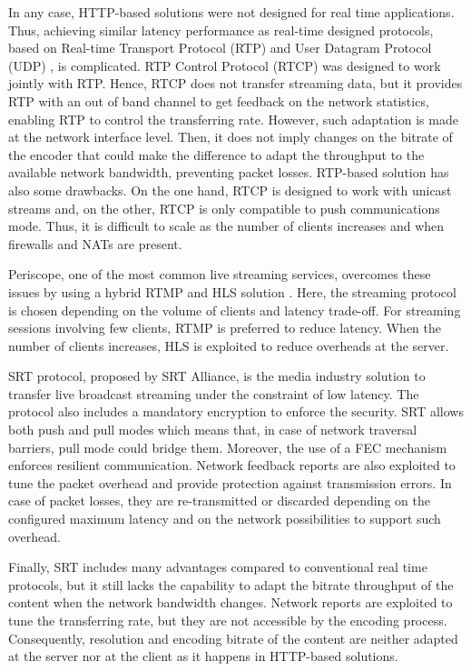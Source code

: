 In any case, HTTP-based solutions were not designed for real time applications. Thus, achieving similar latency performance as real-time designed protocols, based on Real-time Transport Protocol (RTP) and User Datagram Protocol (UDP) \cite{schulzrinne1996rtp}, is complicated.
RTP Control Protocol (RTCP) \cite{ott2010} was designed to work jointly with RTP. Hence, RTCP does not transfer streaming data, but it provides RTP with an out of band channel to get feedback on the network statistics, enabling RTP to control the transferring rate. However, such adaptation is made at the network interface level. Then, it does not imply changes on the bitrate of the encoder that could make the difference to adapt the throughput to the available network bandwidth, preventing packet losses. RTP-based solution has also some drawbacks. On the one hand, RTCP is designed to work with unicast streams and, on the other, RTCP is only compatible to push communications mode. Thus, it is difficult to scale as the number of clients increases and when firewalls and NATs are present.

Periscope, one of the most common live streaming services, overcomes these issues by using a hybrid RTMP and HLS solution \cite{wang2016anatomy}. Here, the streaming protocol is chosen depending on the volume of clients and latency trade-off. For streaming sessions involving few clients, RTMP is preferred to reduce latency. When the number of clients increases, HLS is exploited to reduce overheads at the server.

SRT \cite{srt2018} protocol, proposed by SRT Alliance, is the media industry solution to transfer live broadcast streaming under the constraint of low latency. The protocol also includes a mandatory encryption to enforce the security. SRT allows both push and pull modes which means that, in case of network traversal barriers, pull mode could bridge them. Moreover, the use of a FEC mechanism \cite{luby2002} enforces resilient communication. Network feedback reports are also exploited to tune the packet overhead and provide protection against transmission errors. In case of packet losses, they are re-transmitted or discarded depending on the configured maximum latency and on the network possibilities to support such overhead.

Finally, SRT includes many advantages compared to conventional real time protocols, but it still lacks the capability to adapt the bitrate throughput of the content when the network bandwidth changes. Network reports are exploited to tune the transferring rate, but they are not accessible by the encoding process. Consequently, resolution and encoding bitrate of the content are neither adapted at the server nor at the client as it happens in HTTP-based solutions.

